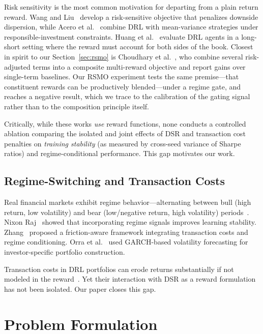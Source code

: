 \documentclass[conference]{IEEEtran}
\begin{document}
Risk sensitivity is the most common motivation for departing from a plain return
reward. Wang and Liu~\cite{Wang2025ART} develop a risk-sensitive objective that
penalizes downside dispersion, while Acero et al.~\cite{Acero2024ESG} combine
DRL with mean-variance strategies under responsible-investment constraints. Huang et
al.~\cite{Huang2024EvalDRL} evaluate DRL agents in a long-short setting where
the reward must account for both sides of the book. Closest in spirit to our
Section~\ref{sec:rsmo} is Choudhary et al.~\cite{Choudhary2025MultiReward},
who combine several risk-adjusted terms into a composite multi-reward objective
and report gains over single-term baselines. Our RSMO experiment tests the same
premise---that constituent rewards can be productively blended---under a regime
gate, and reaches a negative result, which we trace to the calibration of the
gating signal rather than to the composition principle itself.

Critically, while these works \emph{use} reward functions, none conducts a
controlled ablation comparing the isolated and joint effects of DSR and transaction
cost penalties on \emph{training stability} (as measured by cross-seed variance of
Sharpe ratios) and regime-conditional performance. This gap motivates our work.

\subsection{Regime-Switching and Transaction Costs}
Real financial markets exhibit regime behavior—alternating between bull (high
return, low volatility) and bear (low/negative return, high volatility)
periods~\cite{Saltiel2021Adaptive}. Nixon Raj~\cite{Nixon2025Regime} showed that
incorporating regime signals improves learning stability. Zhang~\cite{Zhang2025FRLUX}
proposed a friction-aware framework integrating transaction costs and regime
conditioning. Orra et al.~\cite{Orra2025Volatility} used GARCH-based volatility
forecasting for investor-specific portfolio construction.

Transaction costs in DRL portfolios can erode returns substantially if not
modeled in the reward~\cite{Li2023General}. Yet their interaction with DSR as a
reward formulation has not been isolated. Our paper closes this gap.

\section{Problem Formulation}
\label{sec:formulation}
\end{document}
